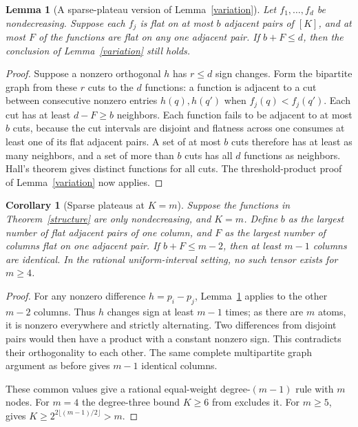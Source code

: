 \documentclass[11pt]{article}
\newtheorem{lemma}[theorem]{Lemma}
\newtheorem{corollary}[theorem]{Corollary}
\begin{document}
\begin{lemma}[A sparse-plateau version of Lemma~\ref{variation}]\label{hall}
Let $f_1,\ldots,f_d$ be nondecreasing. Suppose each $f_j$ is flat
on at most $b$ adjacent pairs of $[K]$, and at most $F$ of the functions
are flat on any one adjacent pair. If $b+F\le d$, then the conclusion
of Lemma~\ref{variation} still holds.
\end{lemma}
\begin{proof}
Suppose a nonzero orthogonal $h$ has $r\le d$ sign changes. Form the
bipartite graph from these $r$ cuts to the $d$ functions: a function is
adjacent to a cut between consecutive nonzero entries $h(q),h(q')$ when
$f_j(q)<f_j(q')$. Each cut has at least $d-F\ge b$ neighbors.
Each function fails to be adjacent to at most $b$ cuts, because the cut
intervals are disjoint and flatness across one consumes at least one of
its flat adjacent pairs. A set of at most $b$ cuts therefore has at least
as many neighbors, and a set of more than $b$ cuts has all $d$ functions
as neighbors. Hall's theorem gives distinct functions for all cuts.
The threshold-product proof of Lemma~\ref{variation} now applies.
\end{proof}

\begin{corollary}[Sparse plateaus at $K=m$]\label{equal-size-plateaus}
Suppose the functions in Theorem~\ref{structure} are only nondecreasing,
and $K=m$. Define $b$ as the largest number of flat adjacent pairs of
one column, and $F$ as the largest number of columns flat on one adjacent
pair. If $b+F\le m-2$, then at least $m-1$ columns are identical.
In the rational uniform-interval setting, no such tensor exists for
$m\ge4$.
\end{corollary}
\begin{proof}
For any nonzero difference $h=p_i-p_j$, Lemma~\ref{hall} applies to
the other $m-2$ columns. Thus $h$ changes sign at least $m-1$ times;
as there are $m$ atoms, it is nonzero everywhere and strictly alternating.
Two differences from disjoint pairs would then have a product with a
constant nonzero sign. This contradicts their orthogonality to each
other. The same complete multipartite graph argument as before gives
$m-1$ identical columns.

These common values give a rational equal-weight degree-$(m-1)$ rule
with $m$ nodes. For $m=4$ the degree-three bound $K\ge6$ from
 excludes it. For $m\ge5$,
 gives
$K\ge2^{2\lfloor(m-1)/2\rfloor}>m$.
\end{proof}
\end{document}
